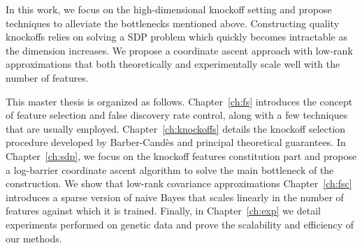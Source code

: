 In this work, we focus on the high-dimensional knockoff setting and propose techniques
to alleviate the bottlenecks mentioned above.
Constructing quality knockoffs relies on solving a SDP problem
which quickly becomes intractable as the dimension increases.
We propose a coordinate ascent approach with low-rank approximations
that both theoretically and experimentally scale well with the number of features.

This master thesis is organized as follows.
Chapter~\ref{ch:fs} introduces the concept of feature selection and
false discovery rate control, along with a few techniques that are usually employed.
Chapter~\ref{ch:knockoffs} details the knockoff selection procedure developed by Barber-Candès
and principal theoretical guarantees.
In Chapter~\ref{ch:sdp},
we focus on the knockoff features constitution part
and propose a log-barrier coordinate ascent algorithm to solve the main bottleneck of the construction.
We show that low-rank covariance approximations
Chapter~\ref{ch:fsc} introduces a sparse version of naive Bayes that scales linearly in the number of features against which
it is trained.
Finally, in Chapter~\ref{ch:exp} we detail experiments performed on genetic data and prove the scalability
and efficiency of our methods.
